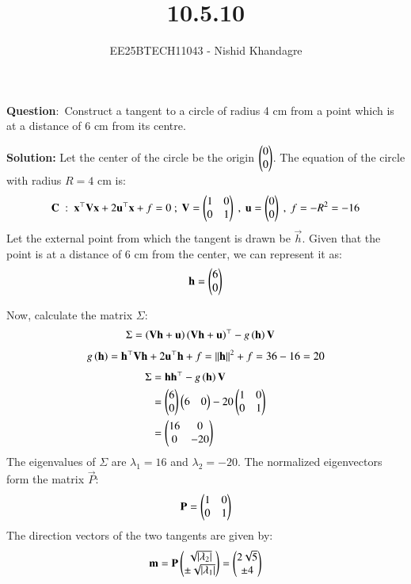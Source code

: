 \documentclass[journal]{IEEEtran}
\title{10.5.10}
\author{EE25BTECH11043 - Nishid Khandagre}
\begin{document}
\maketitle

\renewcommand{\thefigure}{\theenumi}
\renewcommand{\thetable}{\theenumi}


\textbf{Question}:\
Construct a tangent to a circle of radius 4 cm from a point which is at a distance of 6 cm from its centre.

\vspace{2mm}

\textbf{Solution:}
Let the center of the circle be the origin $\begin{pmatrix}0\\0\end{pmatrix}$.
The equation of the circle with radius $R=4$ cm is:
\begin{align}
    \mathbf{C} \ : \ \mathbf{x}^{\top}\mathbf{V}\mathbf{x} + 2\mathbf{u}^{\top}\mathbf{x} + f=0 \ ; \ \mathbf{V}=\begin{pmatrix}1&0\\0&1\end{pmatrix} \ , \ \mathbf{u}=\begin{pmatrix}0\\0\end{pmatrix} \ , \ f=-R^2=-16
\end{align}
Let the external point from which the tangent is drawn be $\vec{h}$.
Given that the point is at a distance of 6 cm from the center, we can represent it as:
\begin{align}
    \mathbf{h}=\begin{pmatrix}6\\0\end{pmatrix}
\end{align}

Now, calculate the matrix $\Sigma$:
\begin{align}
    \Sigma&=\left(\mathbf{V}\mathbf{h} + \mathbf{u}\right)\left(\mathbf{V}\mathbf{h} + \mathbf{u}\right)^{\top} - g\left(\mathbf{h}\right)\mathbf{V}
    \end{align}
    \begin{align}
    g\left(\mathbf{h}\right)=\mathbf{h}^{\top}\mathbf{V}\mathbf{h} + 2\mathbf{u}^{\top}\mathbf{h} + f = \left\lVert\mathbf{h}\right\rVert^2 +f = 36 - 16 = 20
    \end{align}
    \begin{align}
    \Sigma&= \mathbf{h}\mathbf{h}^{\top} - g\left(\mathbf{h}\right)\mathbf{V}\\
    &= \begin{pmatrix}6 \\ 0\end{pmatrix}\begin{pmatrix}6 & 0\end{pmatrix} - 20\begin{pmatrix} 1& 0 \\ 0 &1\end{pmatrix}\\
    &= \begin{pmatrix}16 & 0 \\ 0 & -20\end{pmatrix}
\end{align}
The eigenvalues of $\Sigma$ are $\lambda_1=16$ and $\lambda_2=-20$.
The normalized eigenvectors form the matrix $\vec{P}$:
\begin{align}
    \mathbf{P}=\begin{pmatrix}1 & 0\\0&1\end{pmatrix}
\end{align}
The direction vectors of the two tangents are given by:
\begin{align}
    \mathbf{m}=\mathbf{P}\begin{pmatrix}\sqrt{\left\vert\lambda_2\right\vert} \\ \pm\sqrt{\left\vert\lambda_1\right\vert}\end{pmatrix} =\begin{pmatrix}2\sqrt{5} \\ \pm 4\end{pmatrix}
\end{align}
\end{document}
